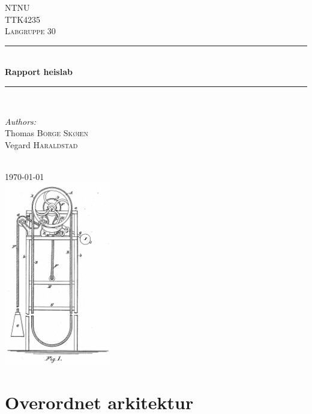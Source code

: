 \documentclass{article}
\begin{document}
\newcommand{\HRule}{\rule{\linewidth}{0.5mm}}

\begin{center}

\textsc{\LARGE NTNU}\\[1.5cm] 
\textsc{\Large TTK4235}\\[0.5cm]
\textsc{\large Labgruppe 30}\\[0.5cm]

\HRule \\[0.4cm]
{ \huge \bfseries Rapport heislab}\\[0.4cm]
\HRule \\[1.5cm]
 
\begin{minipage}{0.6\textwidth}
\begin{flushleft} \large
\emph{Authors:}\\
Thomas \textsc{Borge Skøien} \\Vegard \textsc{Haraldstad} \\
\end{flushleft}
\end{minipage}
~
\\[1cm]

{\large \today}\\[1cm] 

\includegraphics[height=80mm]{rapport/heis.PNG}

\end{center}
\newpage
\cfoot{\normalsize\thepage}

\tableofcontents


\newpage
\nocite{*}
\cfoot{\normalsize\thepage~}
\section{Overordnet arkitektur}
\end{document}
